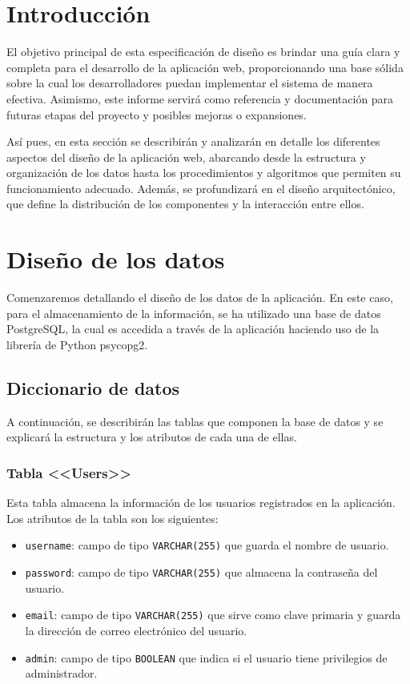 
\section{Introducción}

El objetivo principal de esta especificación de diseño es brindar una guía clara y completa para el desarrollo de la aplicación web, proporcionando una base sólida sobre la cual los desarrolladores puedan implementar el sistema de manera efectiva. Asimismo, este informe servirá como referencia y documentación para futuras etapas del proyecto y posibles mejoras o expansiones.

Así pues, en esta sección se describirán y analizarán en detalle los diferentes aspectos del diseño de la aplicación web, abarcando desde la estructura y organización de los datos hasta los procedimientos y algoritmos que permiten su funcionamiento adecuado. Además, se profundizará en el diseño arquitectónico, que define la distribución de los componentes y la interacción entre ellos.

\section{Diseño de los datos}

Comenzaremos detallando el diseño de los datos de la aplicación. En este caso, para el almacenamiento de la información, se ha utilizado una base de datos PostgreSQL, la cual es accedida a través de la aplicación haciendo uso de la librería de Python psycopg2. 

\subsection{Diccionario de datos}
A continuación, se describirán las tablas que componen la base de datos y se explicará la estructura y los atributos de cada una de ellas.

\subsubsection{Tabla <<Users>>}

Esta tabla almacena la información de los usuarios registrados en la aplicación. Los atributos de la tabla son los siguientes:
\begin{itemize}
    \item \texttt{username}: campo de tipo \texttt{VARCHAR(255)} que guarda el nombre de usuario.
    \item \texttt{password}: campo de tipo \texttt{VARCHAR(255)} que almacena la contraseña del usuario.
    \item \texttt{email}: campo de tipo \texttt{VARCHAR(255)} que sirve como clave primaria y guarda la dirección de correo electrónico del usuario.
    \item \texttt{admin}: campo de tipo \texttt{BOOLEAN} que indica si el usuario tiene privilegios de administrador.
\end{itemize}

